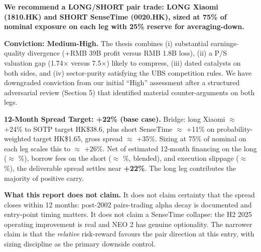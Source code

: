 \documentclass[11pt,a4paper]{article}
\begin{document}
\begin{thesisbox}
\textbf{We recommend a LONG/SHORT pair trade: LONG Xiaomi (1810.HK) and SHORT SenseTime (0020.HK), sized at 75\% of nominal exposure on each leg with 25\% reserve for averaging-down.}

\vspace{0.25cm}

\textbf{Conviction: Medium-High.} The thesis combines (i) substantial earnings-quality divergence (+RMB 39B profit versus \textminus RMB 1.8B loss), (ii) a P/S valuation gap (1.74$\times$ versus 7.5$\times$) likely to compress, (iii) dated catalysts on both sides, and (iv) sector-purity satisfying the UBS competition rules. We have downgraded conviction from our initial ``High'' assessment after a structured adversarial review (Section 5) that identified material counter-arguments on both legs.

\vspace{0.25cm}

\textbf{12-Month Spread Target: +22\% (base case).} Bridge: long Xiaomi $\approx$ +24\% to SOTP target HK\$38.6, plus short SenseTime $\approx$ +11\% on probability-weighted target HK\$1.65, gross spread $\approx$ +35\%. Sizing at 75\% of nominal on each leg scales this to $\approx$ +26\%. Net of estimated 12-month financing on the long ($\approx$ \%), borrow fees on the short ($\approx$ \%, blended), and execution slippage ($\approx$ \%), the deliverable spread settles near \textbf{+22\%}. The long leg contributes the majority of positive carry.

\vspace{0.25cm}

\textbf{What this report does not claim.} It does not claim certainty that the spread closes within 12 months: post-2002 pairs-trading alpha decay is documented and entry-point timing matters. It does not claim a SenseTime collapse: the H2 2025 operating improvement is real and NEO 2 has genuine optionality. The narrower claim is that the \textit{relative} risk-reward favours the pair direction at this entry, with sizing discipline as the primary downside control.
\end{thesisbox}
\end{document}
